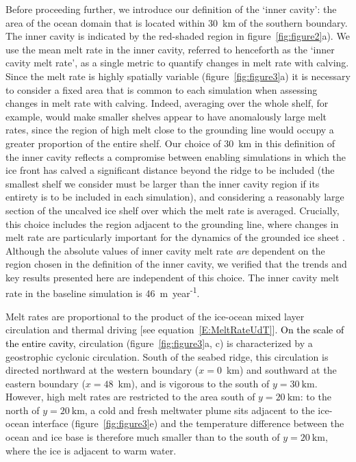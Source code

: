 \documentclass[draft]{agujournal2019}
\newcommand{\rout}[1]{\red{\st{#1}}}\newcommand{\ab}[1]{\textcolor{Green}{#1}}\newcommand{\about}[1]{\textcolor{Cyan}{\sout{#1}}}
\newcommand{\blue}[1]{\textcolor{blue}{#1}}
\newcommand{\red}[1]{\textcolor{red}{#1}}
\renewcommand{\rout}[1]{{}} %
\renewcommand{\blue}[1]{{\textcolor{black}{#1}}} %
\renewcommand{\red}[1]{{}} %
\begin{document}
Before proceeding further, we introduce our definition of the `inner cavity': the area of the ocean domain that is located within 30~km of the southern boundary. The inner cavity is indicated by the red-shaded region in figure~\ref{fig:figure2}a). We use the mean melt rate in the inner cavity, referred to henceforth as the `inner cavity melt rate', as a single metric to quantify changes in melt rate with calving. Since the melt rate is highly spatially variable (figure~\ref{fig:figure3}a) it is necessary to consider a fixed area that is common to each simulation when assessing changes in melt rate with calving. Indeed, averaging over the whole shelf, for example, would make smaller shelves appear to have anomalously large melt rates, since the region of high melt close to the grounding line would occupy a greater proportion of the entire shelf. Our choice of 30~km in this definition of the inner cavity reflects a compromise between enabling simulations in which the ice front has calved a significant distance beyond the ridge to be included (the smallest shelf we consider must be larger than the inner cavity region if its entirety is to be included in each simulation), and considering a reasonably large section of the uncalved ice shelf over which the melt rate is averaged. Crucially, this choice includes the region adjacent to the grounding line, where changes in melt rate are particularly important for the dynamics of the grounded ice sheet \cite{Seroussi2014Cryo, Athern2017GRL}. Although the absolute values of inner cavity melt rate \textit{are} dependent on the region chosen in the definition of the inner cavity, we verified that the trends and key results presented here are independent of this choice. The inner cavity melt rate in the baseline simulation is 46~m~year\textsuperscript{-1}.

Melt rates are proportional to the product of the ice-ocean mixed layer circulation and thermal driving [see equation~\eqref{E:MeltRateUdT}]. \blue{On the scale of the entire cavity,}\rout{Cavity} circulation (figure~\ref{fig:figure3}a, c) is characterized by a geostrophic cyclonic circulation. South of the seabed ridge, this circulation is directed northward at the western boundary ($x=0$~km) and southward at the eastern boundary ($x=48$~km), and is vigorous to the south of $y=30~\text{km}$. However, high melt rates are restricted to the area south of $y=20~\text{km}$: to the north of $y=20~\text{km}$, a cold and fresh meltwater plume sits adjacent to the ice-ocean interface (figure~\ref{fig:figure3}e) and the temperature difference between the ocean and ice base is therefore much smaller than to the south of $y=20~\text{km}$, where the ice is adjacent to warm water.
\end{document}
